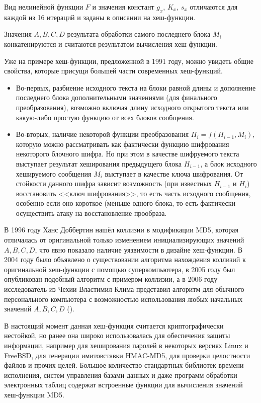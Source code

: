 Вид нелинейной функции $F$ и значения констант $g_x$, $K_x$, $s_x$ отличаются для каждой из 16 итераций и заданы в описании на хеш-функции. 

Значения $A, B, C, D$ результата обработки самого последнего блока $M_i$ конкатенируются и считаются результатом вычисления хеш-функции.

Уже на примере хеш-функции, предложенной в 1991 году, можно увидеть общие свойства, которые присущи большей части современных хеш-функций.

\begin{itemize}
  \item Во-первых, разбиение исходного текста на блоки равной длины и дополнение последнего блока дополнительными значениями (для финального преобразования), возможно включая длину исходного открытого текста или какую-либо простую функцию от всех блоков сообщения.
  \item Во-вторых, наличие некоторой функции преобразования $H_i = f ( H_{i-1}, M_i )$, которую можно рассматривать как фактически функцию шифрования некоторого блочного шифра. Но при этом в качестве шифруемого текста выступает результат хеширования предыдущего блока $H_{i-1}$, а блок исходного хешируемого сообщения $M_i$ выступает в качестве ключа шифрования. От стойкости данного шифра зависит возможность (при известных $H_{i-1}$ и $H_{i}$) восстановить <<ключ шифрования>>, то есть часть исходного сообщения, особенно если оно короткое (меньше одного блока, то есть фактически осуществить атаку на восстановление прообраза.
\end{itemize}

В 1996 году Ханс Доббертин нашёл коллизии в модификации MD5, которая отличалась от оригинальной только изменением инициализирующих значений $A, B, C, D$, что явно показало наличие уязвимости в дизайне хеш-функции. В 2004 году было объявлено о существовании алгоритма нахождения коллизий к оригинальной хеш-функции с помощью суперкомпьютера, в 2005 году был опубликован подобный алгоритм с примером коллизии, а в 2006 году исследователь из Чехии Властимил Клима представил алгоритм для обычного персонального компьютера с возможностью использования любых начальных значений $A, B, C, D$ (\cite{Wang:Feng:Lai:Yu:2004, WangYu:2005, Klima:2006}).

В настоящий момент данная хеш-функция считается криптографически нестойкой, но ранее она широко использовалась для обеспечения защиты информации, например для хеширования паролей в некоторых версиях Linux и FreeBSD, для генерации имитовставки HMAC-MD5, для проверки целостности файлов и прочих целей. Большое количество стандартных библиотек времени исполнения, систем управления базами данных и даже программ обработки электронных таблиц содержат встроенные функции для вычисления значений хеш-функции MD5.

